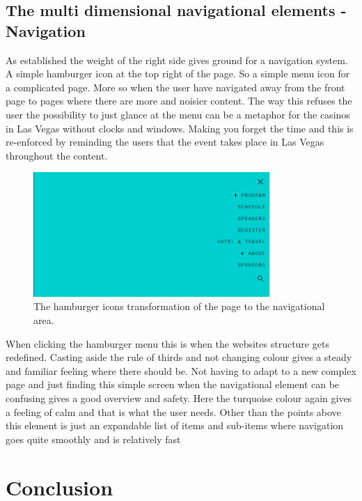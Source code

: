 \documentclass{article}
\begin{document}
        \subsection{The multi dimensional navigational elements - Navigation}
        As established the weight of the right side gives ground for a navigation system. A simple hamburger icon at the top right of the page. So a simple menu icon for a complicated page. More so when the user have navigated away from the front page to pages where there are more and noisier content. The way this refuses the user the possibility to just glance at the menu can be a metaphor for the casinos in Las Vegas without clocks and windows. Making you forget the time and this is re-enforced by reminding the users that the event takes place in Las Vegas throughout the content.
        \begin{figure}[!h]
            \centering
            \includegraphics[width=0.8\textwidth]{NavMenu}
            \caption[width=0.8\textwidth]{The hamburger icons transformation of the page to the navigational area.}
        \end{figure}
        When clicking the hamburger menu this is when the websites structure gets redefined. Casting aside the rule of thirds and not changing colour gives a steady and familiar feeling where there should be. Not having to adapt to a new complex page and just finding this simple screen when the navigational element can be confusing gives a good overview and safety. Here the turquoise colour again gives a feeling of calm and that is what the user needs. Other than the points above this element is just an expandable list of items and sub-items where navigation goes quite smoothly and is relatively fast 
    \section{Conclusion}
    
    
    
        
    
\end{document}
